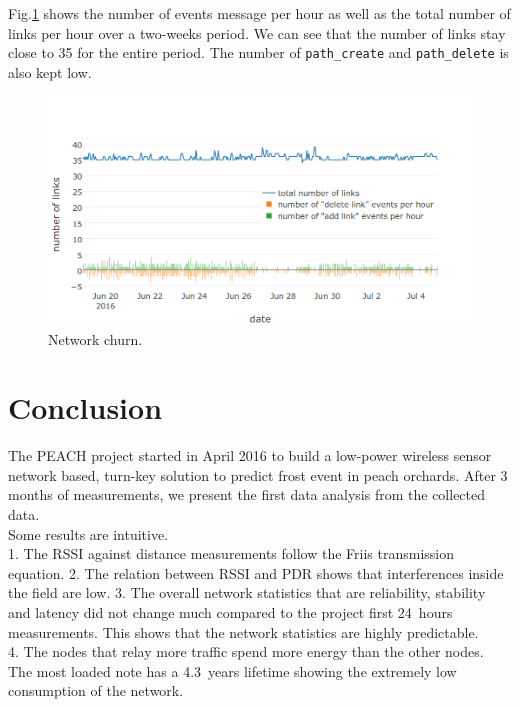 \documentclass{sig-alternate}
\newcommand{\pathcreate}          {{\tt path\_create}\xspace}
\newcommand{\pathdelete}          {{\tt path\_delete}\xspace}
\begin{document}

Fig.\ref{fig:net_churn} shows the number of events message per hour as well as the total number of links per hour over a two-weeks period.
We can see that the number of links stay close to 35 for the entire period.
The number of \pathcreate and \pathdelete is also kept low.

\begin{figure}
    \centering
    \includegraphics[width=\columnwidth]{net_churn}
    \caption{Network churn.}
    \label{fig:net_churn}
\end{figure}

\section{Conclusion}
\label{sec:conclusion}

The PEACH project started in April 2016 to build a low-power wireless sensor network based, turn-key solution to predict frost event in peach orchards.
After 3 months of measurements, we present the first data analysis from the collected data.\\

Some results are intuitive.\\
1. The RSSI against distance measurements follow the Friis transmission equation.
2. The relation between RSSI and PDR shows that interferences inside the field are low.
3. The overall network statistics that are reliability, stability and latency did not change much compared to the project first 24~hours measurements.
This shows that the network statistics are highly predictable.\\
4. The nodes that relay more traffic spend more energy than the other nodes.
The most loaded note has a 4.3~years lifetime showing the extremely low consumption of the network.\\
\end{document}
